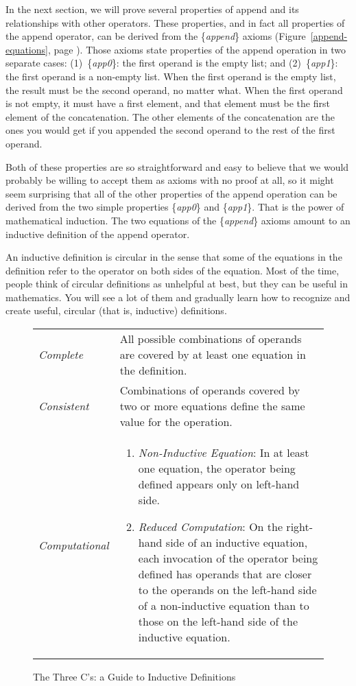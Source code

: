 In the next section, we will prove several properties of \textsf{append}
and its relationships with other operators.
These properties, and in fact all properties of the \textsf{append} operator,
can be derived from the \{\emph{append}\} axioms
(Figure~\ref{append-equations}, page \pageref{append-equations}).
Those axioms state properties of the append operation in two separate cases:
(1)~\{\emph{app0}\}: the first operand is the empty list; and
(2)~\{\emph{app1}\}: the first operand is a non-empty list.
When the first operand is the empty list,
the result must be the second operand, no matter what.
When the first operand is not empty, it must have a first element,
and that element must be the first element of the concatenation.
The other elements of the concatenation are the ones you would get
if you appended the second operand to the rest of the first operand.

Both of these properties are so straightforward and easy to believe
that we would probably be willing to accept them as axioms with no proof at all,
so it might seem surprising that all of the other properties
of the \textsf{append} operation can be derived from
the two simple properties \{\emph{app0}\} and \{\emph{app1}\}.
That is the power of mathematical induction.
The two equations of the \{\emph{append}\} axioms
amount to an inductive definition of the \textsf{append} operator.

An inductive definition is circular in the sense
that some of the equations in the definition refer
to the operator on both sides of the equation.
Most of the time, people think of circular definitions
as unhelpful at best,
but they can be useful in mathematics.
You will see a lot of them and
gradually learn how to recognize and create useful,
circular (that is, inductive) definitions.

\begin{figure}
\begin{center}
\begin{tabular}{lp{3.5in}}
\emph{Complete} & All possible combinations of operands are covered by at least one equation in the definition. \\
\emph{Consistent} & Combinations of operands covered by two or more equations define the same value for the operation. \\
\emph{Computational} &
\begin{enumerate}
\item \emph{Non-Inductive Equation}: In at least one equation,
the operator being defined appears only on left-hand side.
\item \emph{Reduced Computation}: 
\index{three C's}\index{definition!inductive (circular)}On the right-hand side of an inductive equation,
each invocation of the operator being defined has operands that
are closer to the operands on the left-hand side of a non-inductive equation
than to those on the left-hand side of the inductive equation.
\end{enumerate}
\end{tabular}
\end{center}
\caption{The Three C's: a Guide to Inductive Definitions}
\label{fig:inductive-def-keys}
\end{figure}

